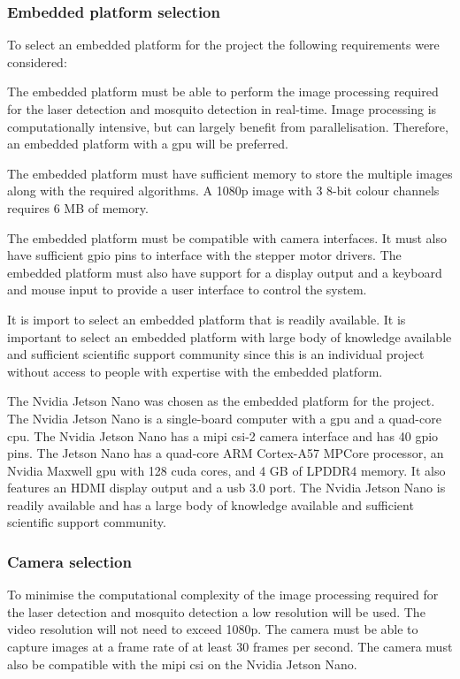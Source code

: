 \subsubsection{Embedded platform selection}
To select an embedded platform for the project the following requirements were considered:
\begin{description}[style=nextline]
    \item[Processing power] The embedded platform must be able to perform the image processing required for the laser detection and mosquito detection in real-time. Image processing is computationally intensive, but can largely benefit from parallelisation. Therefore, an embedded platform with a \gls{gpu} will be preferred.
    \item[Memory] The embedded platform must have sufficient memory to store the multiple images along with the required algorithms. A 1080p image with 3 8-bit colour channels requires 6 MB of memory.
    \item[Hardware interfaces] The embedded platform must be compatible with camera interfaces. It must also have sufficient \gls{gpio} pins to interface with the stepper motor drivers. The embedded platform must also have support for a display output and a keyboard and mouse input to provide a user interface to control the system.
    \item[Availability and support] It is import to select an embedded platform that is readily available. It is important to select an embedded platform with large body of knowledge available and sufficient scientific support community since this is an individual project without access to people with expertise with the embedded platform.
\end{description}

The Nvidia Jetson Nano was chosen as the embedded platform for the project. The Nvidia Jetson Nano is a single-board computer with a \gls{gpu} and a quad-core \gls{cpu}. The Nvidia Jetson Nano has a \gls{mipi} \gls{csi}-2 camera interface and has 40 \gls{gpio} pins. The Jetson Nano has a quad-core ARM Cortex-A57 MPCore processor, an Nvidia Maxwell \gls{gpu} with 128 \gls{cuda} cores, and 4 GB of LPDDR4 memory. It also features an HDMI display output and a \gls{usb} 3.0 port. The Nvidia Jetson Nano is readily available and has a large body of knowledge available and sufficient scientific support community.



\subsubsection{Camera selection}
To minimise the computational complexity of the image processing required for the laser detection and mosquito detection a low resolution will be used. The video resolution will not need to exceed 1080p. The camera must be able to capture images at a frame rate of at least 30 frames per second. The camera must also be compatible with the \gls{mipi} \gls{csi} on the Nvidia Jetson Nano.

